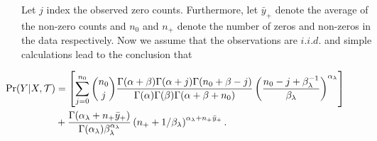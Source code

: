  Let $j$ index the observed zero counts. Furthermore, let $\bar{y}_{+}$ denote the average of the non-zero counts and $n_0$ and $n_+$ denote the number of zeros and non-zeros in the data respectively. 
 Now we assume that the observations are $i.i.d.$ and simple calculations lead to the conclusion that
 
 \begin{align}\label{eqn:zip_int_lhood}\hspace{-.7in}
 \Pr(Y\vert X, \mathcal{T})& = \left[\sum_{j=0}^{n_0} {n_0 \choose j}\frac{\Gamma(\alpha+\beta)\Gamma(\alpha+j)\Gamma(n_0+\beta-j)}{\Gamma(\alpha)\Gamma(\beta)\Gamma(\alpha+\beta+n_0)}\left(\frac{n_0-j+\beta_{\lambda}^{-1}}{\beta_{\lambda}}\right)^{\alpha_{\lambda}} \right] \\ \nonumber
 & + \frac{\Gamma(\alpha_{\lambda}+n_+\bar{y}_+)}{\Gamma(\alpha_{\lambda})\beta_{\lambda}^{\alpha_{\lambda}}}\left(n_+ + 1/\beta_{\lambda} \right)^{\alpha_{\lambda}+n_+\bar{y}_+}.
\end{align}
 
